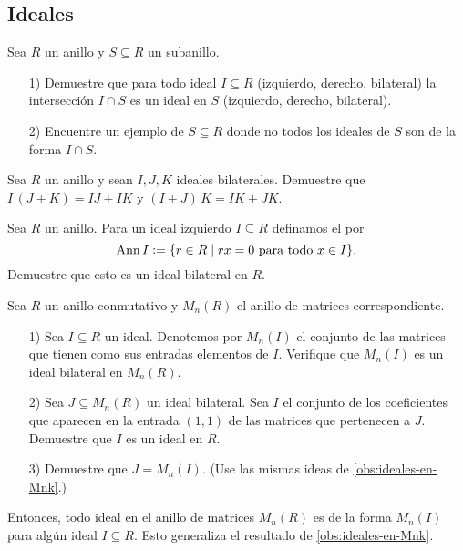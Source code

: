 \subsection*{Ideales}

\begin{ejercicio}
  Sea $R$ un anillo y $S \subseteq R$ un subanillo.

  \begin{enumerate}
  \item[1)] Demuestre que para todo ideal $I \subseteq R$ (izquierdo, derecho,
    bilateral) la intersección $I\cap S$ es un ideal en $S$ (izquierdo, derecho,
    bilateral).

  \item[2)] Encuentre un ejemplo de $S \subseteq R$ donde no todos los ideales
    de $S$ son de la forma $I\cap S$.
  \end{enumerate}
\end{ejercicio}

\begin{ejercicio}
  \label{ejerc:producto-de-anillos-distributivo}
  Sea $R$ un anillo y sean $I,J,K$ ideales bilaterales. Demuestre que
  $I\,(J+K) = IJ + IK$ y $(I+J)\,K = IK + JK$.
\end{ejercicio}

\begin{ejercicio}
  Sea $R$ un anillo. Para un ideal izquierdo $I\subseteq R$ definamos
  el  por
  $$\operatorname{Ann} I \mathrel{\mathop:}= \{ r\in R \mid rx = 0\text{ para todo }x\in I \}.$$
  Demuestre que esto es un ideal bilateral en $R$.
\end{ejercicio}

\begin{ejercicio}
  \label{ejerc:ideales-en-MnR}
  Sea $R$ un anillo conmutativo y $M_n (R)$ el anillo de matrices
  correspondiente.

  \begin{enumerate}
  \item[1)] Sea $I \subseteq R$ un ideal. Denotemos por $M_n (I)$ el conjunto
    de las matrices que tienen como sus entradas elementos de $I$. Verifique que
    $M_n (I)$ es un ideal bilateral en $M_n (R)$.

  \item[2)] Sea $J \subseteq M_n (R)$ un ideal bilateral. Sea $I$ el conjunto
    de los coeficientes que aparecen en la entrada $(1,1)$ de las matrices
    que pertenecen a $J$. Demuestre que $I$ es un ideal en $R$.

  \item[3)] Demuestre que $J = M_n (I)$. (Use las mismas ideas
    de \ref{obs:ideales-en-Mnk}.)
  \end{enumerate}

  Entonces, todo ideal en el anillo de matrices $M_n (R)$ es de la forma
  $M_n (I)$ para algún ideal $I \subseteq R$. Esto generaliza el resultado
  de \ref{obs:ideales-en-Mnk}.
\end{ejercicio}

